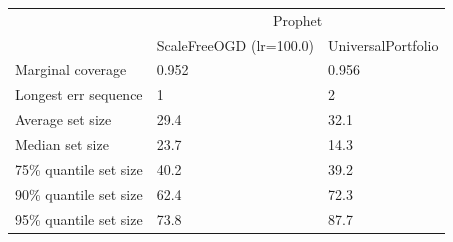 \begin{tabular}{lll}
\toprule
& \multicolumn{2}{c}{Prophet} \\
& ScaleFreeOGD (lr=100.0) & UniversalPortfolio \\
\midrule
Marginal coverage & 0.952 & 0.956 \\
Longest err sequence & 1 & 2 \\
Average set size & 29.4 & 32.1 \\
Median set size & 23.7 & 14.3 \\
75\% quantile set size & 40.2 & 39.2 \\
90\% quantile set size & 62.4 & 72.3 \\
95\% quantile set size & 73.8 & 87.7 \\
\bottomrule
\end{tabular}
